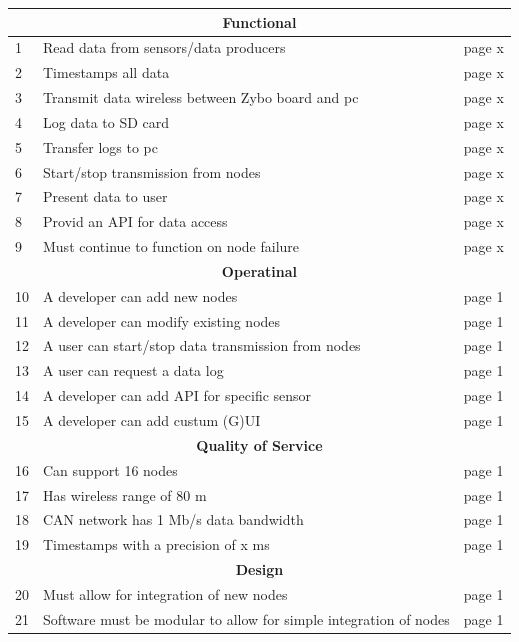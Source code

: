\begin{tabular}{ |p{0.3cm}|p{8.5cm}|p{1cm}| }
\hline
\multicolumn{3}{|c|}{\textbf{Functional}}\\
\hline
1 & Read data from sensors/data producers 				& page x \\
2 & Timestamps all data 								& page x \\
3 & Transmit data wireless between Zybo board and pc 	& page x \\
4 & Log data to SD card 								& page x \\
5 & Transfer logs to pc 								& page x \\
6 & Start/stop transmission from nodes 					& page x \\
7 & Present data to user								& page x \\
8 & Provid an API for data access						& page x \\
9 & Must continue to function on node failure			& page x \\

\hline
\multicolumn{3}{|c|}{\textbf{Operatinal}}\\
\hline	
10 & A developer can add new nodes 						& page 1 \\
11 & A developer can modify existing nodes 				& page 1 \\
12 & A user can start/stop data transmission from nodes	& page 1 \\
13 & A user can request a data log 						& page 1 \\
14 & A developer can add API for specific sensor 		& page 1 \\
15 & A developer can add custum (G)UI					& page 1 \\


\hline
\multicolumn{3}{|c|}{\textbf{Quality of Service}}\\
\hline	
16 & Can support 16 nodes							 	& page 1 \\
17 & Has wireless range of 80 m						 	& page 1 \\
18 & CAN network has 1 Mb/s data bandwidth			 	& page 1 \\
19 & Timestamps with a precision of x ms 			 	& page 1 \\

\hline
\multicolumn{3}{|c|}{\textbf{Design}}\\
\hline	
20 & Must allow for integration of new nodes		 					& page 1 \\
21 & Software must be modular to allow for simple integration of nodes	& page 1 \\



\hline
\end{tabular}

